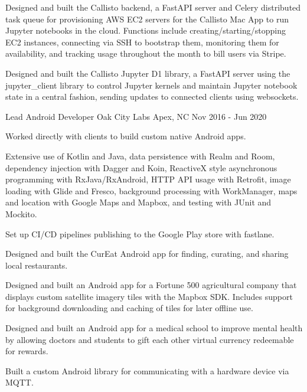 \begin{cventries}
{\begin{cvitems}
        \item {Designed and built the Callisto backend, a FastAPI server and Celery distributed task queue for provisioning AWS EC2 servers for the Callisto Mac App to run Jupyter notebooks in the cloud. Functions include creating/starting/stopping EC2 instances, connecting via SSH to bootstrap them, monitoring them for availability, and tracking usage throughout the month to bill users via Stripe.}
        \item {Designed and built the Callisto Jupyter D1 library, a FastAPI server using the jupyter\_client library to control Jupyter kernels and maintain Jupyter notebook state in a central fashion, sending updates to connected clients using websockets.}
      \end{cvitems}
    }

  \cventry
    {Lead Android Developer} %
    {Oak City Labs} %
    {Apex, NC} %
    {Nov 2016 - Jun 2020} %
    {
      \begin{cvitems} %
        \item {Worked directly with clients to build custom native Android apps.}
        \item {Extensive use of Kotlin and Java, data persistence with Realm and Room, dependency injection with Dagger and Koin, ReactiveX style asynchronous programming with RxJava/RxAndroid, HTTP API usage with Retrofit, image loading with Glide and Fresco, background processing with WorkManager, maps and location with Google Maps and Mapbox, and testing with JUnit and Mockito.}
        \item {Set up CI/CD pipelines publishing to the Google Play store with fastlane.}
        \item {Designed and built the CurEat Android app for finding, curating, and sharing local restaurants.}
        \item {Designed and built an Android app for a Fortune 500 agricultural company that displays custom satellite imagery tiles with the Mapbox SDK. Includes support for background downloading and caching of tiles for later offline use.}
        \item {Designed and built an Android app for a medical school to improve mental health by allowing doctors and students to gift each other virtual currency redeemable for rewards.}
        \item {Built a custom Android library for communicating with a hardware device via MQTT.}
      \end{cvitems}
    }


\end{cventries}
